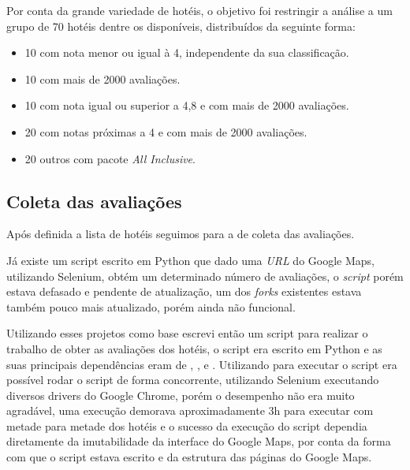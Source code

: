 
Por conta da grande variedade de hotéis, o objetivo foi restringir a análise a um grupo de 70 hotéis dentre os disponíveis, distribuídos da seguinte forma:

\begin{itemize}
  \item 10 com nota menor ou igual à 4, independente da sua classificação.
  \item 10 com mais de 2000 avaliações.
  \item 10 com nota igual ou superior a 4,8 e com mais de 2000 avaliações.
  \item 20 com notas próximas a 4 e com mais de 2000 avaliações.
  \item 20 outros com pacote \emph{All Inclusive}.
\end{itemize}




\subsection{Coleta das avaliações}
\label{cap:metodologia:sec:conjunto_dados:sec:coleta}

Após definida a lista de hotéis seguimos para a de coleta das avaliações.

Já existe um script escrito em Python \cite{gaspa93scrapper2023} que dado uma \emph{URL} do Google Maps, utilizando Selenium, obtém um determinado número de avaliações, o \emph{script} porém estava defasado e pendente de atualização, um dos \emph{forks} existentes  estava também pouco mais atualizado, porém ainda não funcional.

Utilizando esses projetos como base escrevi então um script para realizar o trabalho de obter as avaliações dos hotéis, o script era escrito em Python e as suas principais dependências eram de \cite{selenium2023}, ,  e . Utilizando  para executar o script era possível rodar o script de forma concorrente, utilizando Selenium executando diversos drivers do Google Chrome, porém o desempenho não era muito agradável, uma execução demorava aproximadamente 3h para executar com metade para metade dos hotéis e o sucesso da execução do script dependia diretamente da imutabilidade da interface do Google Maps, por conta da forma com que o script estava escrito e da estrutura das páginas do Google Maps.

